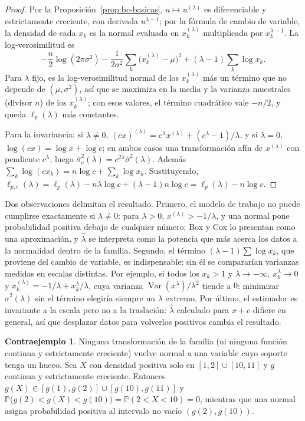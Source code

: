 \documentclass[11pt,a4paper]{article}
\theoremstyle{plain}
\theoremstyle{definition}
\newtheorem{contraejemplo}[teorema]{Contraejemplo}
\theoremstyle{remark}
\newcommand{\Prob}{\mathbb{P}}
\newcommand{\Var}{\operatorname{Var}}
\newcommand{\1}{\mathbf{1}}
\begin{document}
\begin{proof}
Por la Proposición~\ref{prop:bc-basicas}, $u\mapsto u^{(\lambda)}$ es
diferenciable y estrictamente creciente, con derivada $u^{\lambda-1}$; por
la fórmula de cambio de variable, la densidad de cada $x_k$ es la normal
evaluada en $x_k^{(\lambda)}$ multiplicada por $x_k^{\lambda-1}$. La
log-verosimilitud es
\[
-\frac n2\log(2\pi\sigma^2)-\frac1{2\sigma^2}\sum_k\bigl(x_k^{(\lambda)}-\mu\bigr)^2+(\lambda-1)\sum_k\log x_k .
\]
Para $\lambda$ fijo, es la log-verosimilitud normal de los
$x_k^{(\lambda)}$ más un término que no depende de $(\mu,\sigma^2)$, así
que se maximiza en la media y la varianza muestrales (divisor $n$) de los
$x_k^{(\lambda)}$; con esos valores, el término cuadrático vale $-n/2$, y
queda $\ell_p(\lambda)$ más constantes.

Para la invariancia: si $\lambda\ne0$,
$(cx)^{(\lambda)}=c^\lambda x^{(\lambda)}+(c^\lambda-1)/\lambda$, y si
$\lambda=0$, $\log(cx)=\log x+\log c$; en ambos casos una transformación
afín de $x^{(\lambda)}$ con pendiente $c^\lambda$, luego
$\hat\sigma_c^2(\lambda)=c^{2\lambda}\hat\sigma^2(\lambda)$. Además
$\sum_k\log(cx_k)=n\log c+\sum_k\log x_k$. Sustituyendo,
$\ell_{p,c}(\lambda)=\ell_p(\lambda)-n\lambda\log c+(\lambda-1)n\log
c=\ell_p(\lambda)-n\log c$.
\end{proof}

Dos observaciones delimitan el resultado. Primero, el modelo de trabajo
no puede cumplirse exactamente si $\lambda\ne0$: para $\lambda>0$,
$x^{(\lambda)}>-1/\lambda$, y una normal pone probabilidad positiva debajo
de cualquier número; Box y Cox lo presentan como una aproximación, y
$\hat\lambda$ se interpreta como la potencia que más acerca los datos a la
normalidad dentro de la familia. Segundo, el término
$(\lambda-1)\sum\log x_k$, que proviene del cambio de variable, es
indispensable: sin él se compararían varianzas medidas en escalas
distintas. Por ejemplo, si todos los $x_k>1$ y $\lambda\to-\infty$,
$x_k^\lambda\to0$ y $x_k^{(\lambda)}=-1/\lambda+x_k^\lambda/\lambda$, cuya
varianza $\Var(x^\lambda)/\lambda^2$ tiende a $0$: minimizar
$\hat\sigma^2(\lambda)$ sin el término elegiría siempre un $\lambda$
extremo. Por último, el estimador es invariante a la escala pero no a la
traslación: $\hat\lambda$ calculado para $x+c$ difiere en general, así que
desplazar datos para volverlos positivos cambia el resultado.

\begin{contraejemplo}\label{ce:gap}
Ninguna transformación de la familia (ni ninguna función continua y
estrictamente creciente) vuelve normal a una variable cuyo soporte tenga un
hueco. Sea $X$ con densidad positiva solo en $[1,2]\cup[10,11]$ y $g$
continua y estrictamente creciente. Entonces $g(X)\in[g(1),g(2)]\cup[g(10),g(11)]$
y $\Prob\bigl(g(2)<g(X)<g(10)\bigr)=\Prob(2<X<10)=0$, mientras que una
normal asigna probabilidad positiva al intervalo no vacío $(g(2),g(10))$.
\end{contraejemplo}
\end{document}
